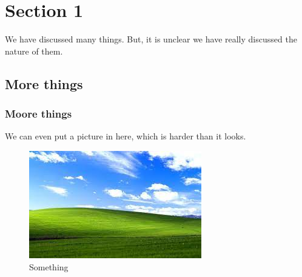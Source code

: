 \chapter{Section 1}

We have discussed many things.
But, it is unclear we have really discussed the nature of them.

\section{More things}

\subsection{Moore things}

We can even put a picture in here, which is harder than it looks.

\begin{figure}[htbp]
\centerline{\includegraphics[width = .85\textwidth]{Unknown.jpeg}}
\caption{Something}
\label{fig}
\end{figure}